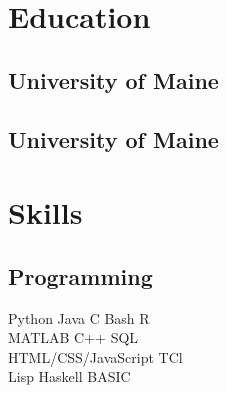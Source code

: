 \documentclass[letterpaper]{AMcEnaneyResume} %
\begin{document}
\begin{minipage}[t]{0.33\textwidth} %


\section{Education} 

    \subsection{University of Maine}

    \sectionspace

    \subsection{University of Maine}


    \sectionspace %


\section{Skills}

    \subsection{Programming}

        \textbullet{} Python \textbullet{} Java \textbullet{} C \textbullet{} Bash \textbullet{} R \\
        \textbullet{} MATLAB \textbullet{} C++ \textbullet{} SQL \\ 
        \textbullet{} HTML/CSS/JavaScript \textbullet{} TCl \\
        \textbullet{} Lisp \textbullet{} Haskell \textbullet{} BASIC
        

\end{minipage}
\end{document}

